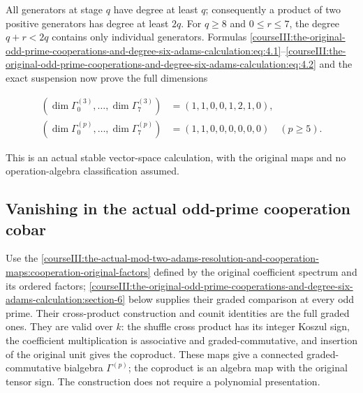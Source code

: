 All generators at stage \(q\) have degree at least \(q\); consequently a product of two positive generators has degree at least \(2q\). For \(q\geq8\) and \(0\leq r\leq7\), the degree \(q+r<2q\) contains only individual generators. Formulas \eqref{courseIII:the-original-odd-prime-cooperations-and-degree-six-adams-calculation:eq:4.1}--\eqref{courseIII:the-original-odd-prime-cooperations-and-degree-six-adams-calculation:eq:4.2} and the exact suspension now prove the full dimensions

\begin{equation}
\begin{aligned}
 (\dim\Gamma^{(3)}_0,\ldots,\dim\Gamma^{(3)}_7)
  &=(1,1,0,0,1,2,1,0),\\
 (\dim\Gamma^{(p)}_0,\ldots,\dim\Gamma^{(p)}_7)
  &=(1,1,0,0,0,0,0,0)\quad(p\geq5).
\end{aligned}
 \label{courseIII:the-original-odd-prime-cooperations-and-degree-six-adams-calculation:eq:4.3}
\end{equation}

This is an actual stable vector-space calculation, with the original maps and no operation-algebra classification assumed.

\subsection{Vanishing in the actual odd-prime cooperation cobar}
\label{courseIII:the-original-odd-prime-cooperations-and-degree-six-adams-calculation:odd-actual-cobar}

\label{courseIII:the-original-odd-prime-cooperations-and-degree-six-adams-calculation:section-5}\label{courseIII:odd-coop:5}

Use the \cref{courseIII:the-actual-mod-two-adams-resolution-and-cooperation-maps:cooperation-original-factors} defined by the original coefficient spectrum and its ordered factors; \cref{courseIII:the-original-odd-prime-cooperations-and-degree-six-adams-calculation:section-6} below supplies their graded comparison at every odd prime. Their cross-product construction and counit identities are the full graded ones. They are valid over \(k\): the shuffle cross product has its integer Koszul sign, the coefficient multiplication is associative and graded-commutative, and insertion of the original unit gives the coproduct. These maps give a connected graded-commutative bialgebra \(\Gamma^{(p)}\); the coproduct is an algebra map with the original tensor sign. The construction does not require a polynomial presentation.

